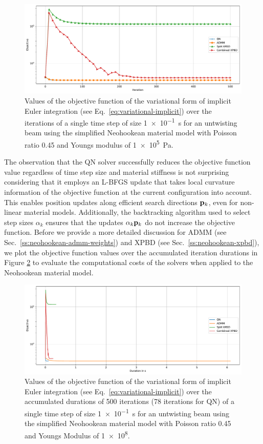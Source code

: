 \begin{figure}[t]
    \includegraphics[width=\textwidth]{figures/neohookean_objectives.pdf}
    \caption{Values of the objective function of the variational form of implicit Euler integration (see Eq.\ \ref{eq:variational-implicit}) over the iterations of 
        a single time step of size \SI{1e-1}{\second} for an untwisting beam using the simplified Neohookean material model with Poisson ratio 0.45 and Youngs modulus of 
    \SI{1e5}{\pascal}.}
    \label{fig:neohookean-objective}
\end{figure}

The observation that the QN solver successfully reduces the objective function value regardless of time step size and material stiffness is not surprising considering 
that it employs an L-BFGS update that takes local curvature information of the objective function at the current configuration into account. This enables position 
updates along efficient search directions $\mathbf{p}_k$, even for non-linear material models. Additionally, the backtracking algorithm used to select step sizes $\alpha_k$
ensures that the updates $\alpha_k\mathbf{p}_k$ do not increase the objective function. Before we provide a more detailed discussion for ADMM (see Sec.\ 
\ref{ss:neohookean-admm-weights}) and XPBD (see Sec.\ \ref{ss:neohookean-xpbd}), we plot the objective function values over the accumulated iteration durations in Figure 
\ref{fig:neohookean-durations} to evaluate the computational costs of the solvers when applied to the Neohookean material model.

\begin{figure}[t]
    \includegraphics[width=\textwidth]{figures/neohookean_objectives_time.pdf}
    \caption{Values of the objective function of the variational form of implicit Euler integration (see Eq.\ \ref{eq:variational-implicit}) over the accumulated durations of 
        500 iterations (78 iterations for QN) of a single time step of size \SI{1e-1}{\second} for an untwisting beam using the simplified Neohookean material model with Poisson ratio 0.45 and
        Youngs Modulus of \num{1e8}{\pascal}.}
    \label{fig:neohookean-durations}
\end{figure}

